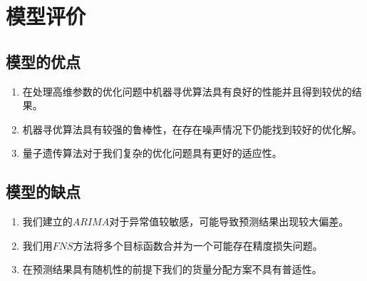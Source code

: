 \documentclass{MathorCupmodeling}
\begin{document}
	\section{模型评价}
	\subsection{模型的优点}
	\begin{enumerate}
		\item 在处理高维参数的优化问题中机器寻优算法具有良好的性能并且得到较优的结果。
		\item 机器寻优算法具有较强的鲁棒性，在存在噪声情况下仍能找到较好的优化解。
		\item 量子遗传算法对于我们复杂的优化问题具有更好的适应性。
	\end{enumerate}
	\subsection{模型的缺点}
	\begin{enumerate}
		\item 我们建立的$ARIMA$对于异常值较敏感，可能导致预测结果出现较大偏差。
		\item 我们用$FNS$方法将多个目标函数合并为一个可能存在精度损失问题。
		\item 在预测结果具有随机性的前提下我们的货量分配方案不具有普适性。
	\end{enumerate}

\end{document}
